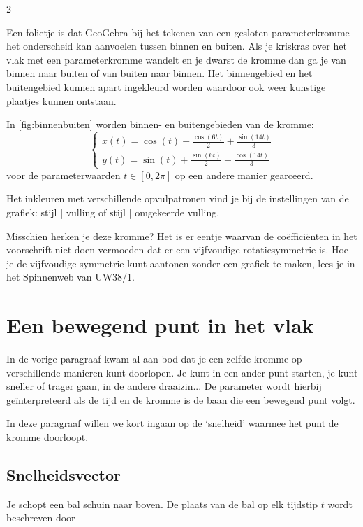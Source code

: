 \begin{multicols}{2}

Een folietje is dat GeoGebra bij het tekenen van een gesloten parameterkromme het onderscheid kan aanvoelen tussen binnen en buiten. Als je kriskras over het vlak met een parameterkromme wandelt en je dwarst de kromme dan ga je van binnen naar buiten of van buiten naar binnen. Het binnengebied en het buitengebied kunnen apart ingekleurd worden waardoor ook weer kunstige plaatjes kunnen ontstaan. 

In \autoref{fig:binnenbuiten} worden binnen- en buitengebieden van de kromme:
\[ \begin{cases}
x(t)= \cos(t)+\frac{\cos(6t)}{2}+\frac{\sin(14t)}{3} \\
y(t)= \sin(t)+\frac{\sin(6t)}{2}+\frac{\cos(14t)}{3} 
\end{cases}\]
voor de parameterwaarden $t \in [0,2 \pi]$ op een andere manier gearceerd.

Het inkleuren met verschillende opvulpatronen vind je bij de instellingen van de grafiek: stijl | vulling of stijl | omgekeerde vulling.


Misschien herken je deze kromme? Het is er eentje waarvan de coëfficiënten in het voorschrift niet doen vermoeden dat er een vijfvoudige rotatiesymmetrie is. Hoe je de vijfvoudige symmetrie kunt aantonen zonder een grafiek te maken, lees je in het Spinnenweb van UW38/1.

\section{Een bewegend punt in het vlak}

In de vorige paragraaf kwam al aan bod dat je een zelfde kromme op verschillende manieren kunt doorlopen. Je kunt in een ander punt starten, je kunt sneller of trager gaan, in de andere draaizin... De parameter wordt hierbij geïnterpreteerd als de tijd en de kromme is de baan die een bewegend punt volgt.

In deze paragraaf willen we kort ingaan op de `snelheid' waarmee het punt de kromme doorloopt.

\subsection{Snelheidsvector}

Je schopt een bal schuin naar boven. De plaats van de bal op elk tijdstip $t$ wordt beschreven door


\end{multicols}
